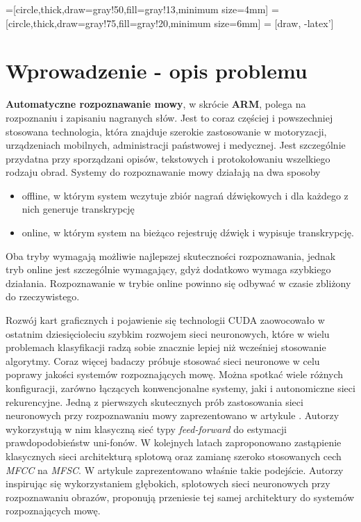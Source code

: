 \documentclass[shortabstract, mgr]{iithesis}
\author{Aleksander Sas}
\begin{document}
=[circle,thick,draw=gray!50,fill=gray!13,minimum size=4mm]
=[circle,thick,draw=gray!75,fill=gray!20,minimum size=6mm]
 = [draw, -latex']


\chapter{Wprowadzenie - opis problemu}
	\textbf{Automatyczne rozpoznawanie mowy}, w skrócie \textbf{ARM}, polega na rozpoznaniu i zapisaniu nagranych słów. Jest to coraz częściej i powszechniej stosowana technologia, która znajduje szerokie zastosowanie w motoryzacji, urządzeniach mobilnych, administracji państwowej i medycznej. Jest szczególnie przydatna przy sporządzani opisów, tekstowych i protokołowaniu wszelkiego rodzaju obrad. Systemy do rozpoznawanie mowy działają na dwa sposoby
	\begin{itemize}
		\item offline, w którym system wczytuje zbiór nagrań dźwiękowych i dla każdego z nich generuje transkrypcję
		\item online, w którym system na bieżąco rejestruję dźwięk i wypisuje transkrypcję.
	\end{itemize}
	Oba tryby wymagają możliwie najlepszej skuteczności rozpoznawania, jednak tryb online jest szczególnie wymagający, gdyż dodatkowo wymaga szybkiego działania. Rozpoznawanie w trybie online powinno się odbywać w czasie zbliżony do rzeczywistego. 
	
	Rozwój kart graficznych i pojawienie się technologii CUDA zaowocowało w ostatnim dziesięcioleciu szybkim rozwojem sieci neuronowych, które w wielu problemach klasyfikacji radzą sobie znacznie lepiej niż wcześniej stosowanie algorytmy. Coraz więcej badaczy próbuje stosować sieci neuronowe w celu poprawy jakości systemów rozpoznających mowę. Można spotkać wiele różnych konfiguracji, zarówno łączących konwencjonalne systemy, jaki i autonomiczne sieci rekurencyjne.
	Jedną z pierwszych skutecznych prób zastosowania sieci neuronowych przy rozpoznawaniu mowy zaprezentowano w artykule \cite{NN_ASR_monophones}. Autorzy wykorzystują w nim klasyczną sieć typy \textit{feed-forward} do estymacji prawdopodobieństw uni-fonów. W kolejnych latach zaproponowano zastąpienie klasycznych sieci architekturą splotową oraz zamianę szeroko stosowanych cech \textit{MFCC} na \textit{MFSC}. W artykule \cite{article1} zaprezentowano właśnie takie podejście. Autorzy inspirując się wykorzystaniem głębokich, splotowych sieci neuronowych przy rozpoznawaniu obrazów, proponują przeniesie tej samej architektury do systemów rozpoznających mowę.
	
\end{document}
